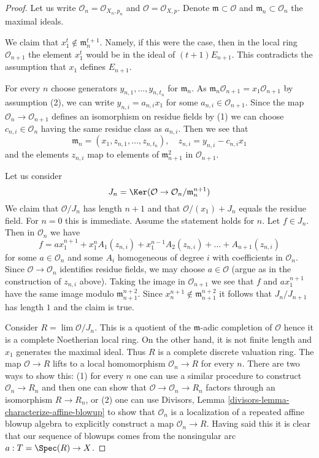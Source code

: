 \begin{proof}
Let us write $\mathcal{O}_n = \mathcal{O}_{X_n, p_n}$
and $\mathcal{O} = \mathcal{O}_{X, p}$. Denote
$\mathfrak m \subset \mathcal{O}$ and $\mathfrak m_n \subset \mathcal{O}_n$
the maximal ideals.

\medskip\noindent
We claim that $x_1^t \not \in \mathfrak m_n^{t + 1}$.
Namely, if this were the case, then in the local ring
$\mathcal{O}_{n + 1}$ the element $x_1^t$ would be in the ideal of
$(t + 1)E_{n + 1}$.
This contradicts the assumption that $x_1$ defines $E_{n + 1}$.

\medskip\noindent
For every $n$ choose generators $y_{n, 1}, \ldots, y_{n, t_n}$
for $\mathfrak m_n$. As
$\mathfrak m_n \mathcal{O}_{n + 1} = x_1\mathcal{O}_{n + 1}$
by assumption (2), we can write $y_{n, i} = a_{n, i} x_1$
for some $a_{n, i} \in \mathcal{O}_{n + 1}$. Since
the map $\mathcal{O}_n \to \mathcal{O}_{n + 1}$ defines
an isomorphism on residue fields by (1) we can choose
$c_{n, i} \in \mathcal{O}_n$ having the same residue class as
$a_{n, i}$. Then we see that
$$
\mathfrak m_n = (x_1, z_{n, 1}, \ldots, z_{n, t_n}),
\quad z_{n, i} = y_{n, i} - c_{n, i} x_1
$$
and the elements $z_{n, i}$ map to elements of $\mathfrak m_{n + 1}^2$
in $\mathcal{O}_{n + 1}$.

\medskip\noindent
Let us consider
$$
J_n = \Ker(\mathcal{O} \to \mathcal{O}_n/\mathfrak m_n^{n + 1})
$$
We claim that $\mathcal{O}/J_n$ has length $n + 1$ and that
$\mathcal{O}/(x_1) + J_n$ equals the residue field. For $n = 0$
this is immediate. Assume the statement holds for $n$.
Let $f \in J_n$. Then in $\mathcal{O}_n$ we have
$$
f = a x_1^{n + 1} + x_1^n A_1(z_{n, i}) +
x_1^{n - 1} A_2(z_{n, i}) + \ldots + A_{n + 1}(z_{n, i})
$$
for some $a \in \mathcal{O}_n$ and some $A_i$ homogeneous of degree $i$
with coefficients in $\mathcal{O}_n$. Since $\mathcal{O} \to \mathcal{O}_n$
identifies residue fields, we may choose $a \in \mathcal{O}$
(argue as in the construction of $z_{n, i}$ above).
Taking the image in
$\mathcal{O}_{n + 1}$ we see that $f$ and $a x_1^{n + 1}$
have the same image modulo $\mathfrak m_{n + 1}^{n + 2}$.
Since $x_n^{n + 1} \not \in \mathfrak m_{n + 1}^{n + 2}$
it follows that $J_n/J_{n + 1}$ has length $1$ and the claim is true.

\medskip\noindent
Consider $R = \lim \mathcal{O}/J_n$. This is a quotient of
the $\mathfrak m$-adic completion of $\mathcal{O}$ hence it is
a complete Noetherian local ring. On the other hand, it is
not finite length and $x_1$ generates the maximal ideal.
Thus $R$ is a complete discrete valuation ring.
The map $\mathcal{O} \to R$ lifts to a local homomorphism
$\mathcal{O}_n \to R$ for every $n$. There are two ways to show this:
(1) for every $n$ one can use a similar procedure
to construct $\mathcal{O}_n \to R_n$ and then one can
show that $\mathcal{O} \to \mathcal{O}_n \to R_n$ factors
through an isomorphism $R \to R_n$, or (2) one can use
Divisors, Lemma \ref{divisors-lemma-characterize-affine-blowup}
to show that $\mathcal{O}_n$ is a localization of a repeated
affine blowup algebra to explicitly construct a map $\mathcal{O}_n \to R$.
Having said this it is clear that our sequence of blowups
comes from the nonsingular arc $a : T = \Spec(R) \to X$.
\end{proof}

